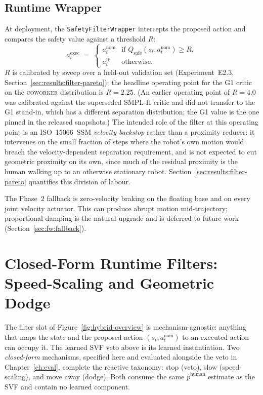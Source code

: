 \documentclass[11pt,a4paper]{report}
\newcommand{\ssm}{SSM}
\newcommand{\iso}{ISO~15066}
\newcommand{\coworker}{\textsc{coworker}}
\begin{document}
\subsection{Runtime Wrapper}
\label{sec:method:filter:runtime}

At deployment, the \texttt{SafetyFilterWrapper} intercepts the
proposed action and compares the safety value against a threshold
$R$:
\begin{equation}
  a^{\mathrm{exec}}_t \;=\;
  \begin{cases}
    a^{\mathrm{nom}}_t   & \text{if } Q_{\mathrm{safe}}(s_t, a^{\mathrm{nom}}_t) \ge R, \\
    a^{\mathrm{fb}}_t    & \text{otherwise.}
  \end{cases}
  \label{eq:filter-rule}
\end{equation}
$R$ is calibrated by sweep over a held-out validation set
(Experiment~E2.3, Section~\ref{sec:results:filter-pareto}); the
headline operating point for the G1 critic on the \coworker{}
distribution is $R = 2.25$. (An earlier operating point of $R = 4.0$
was calibrated against the superseded SMPL-H critic and did not
transfer to the G1 stand-in, which has a different separation
distribution; the G1 value is the one pinned in the released
snapshots.) The intended role of the filter at this operating point
is an \iso{}~\ssm{} \emph{velocity backstop} rather than a proximity
reducer: it intervenes on the small fraction of steps where the
robot's own motion would breach the velocity-dependent separation
requirement, and is not expected to cut geometric proximity on its
own, since much of the residual proximity is the human walking up to
an otherwise stationary robot. Section~\ref{sec:results:filter-pareto}
quantifies this division of labour.

The Phase~2 fallback is zero-velocity braking on the floating base
and on every joint velocity actuator. This can produce abrupt
motion mid-trajectory; proportional damping is the natural upgrade
and is deferred to future work (Section~\ref{sec:fw:fallback}).

\section{Closed-Form Runtime Filters: Speed-Scaling and Geometric Dodge}
\label{sec:method:filter:closedform}

The filter slot of Figure~\ref{fig:hybrid-overview} is
mechanism-agnostic: anything that maps the state and the proposed
action $(s_t, a^{\mathrm{nom}}_t)$ to an executed action can occupy
it. The learned SVF veto above is its learned instantiation. Two
\emph{closed-form} mechanisms, specified here and evaluated alongside
the veto in Chapter~\ref{ch:eval}, complete the reactive taxonomy:
stop (veto), slow (speed-scaling), and move away (dodge). Both
consume the same $\hat{p}^{\mathrm{human}}$ estimate as the SVF and
contain no learned component.
\end{document}
